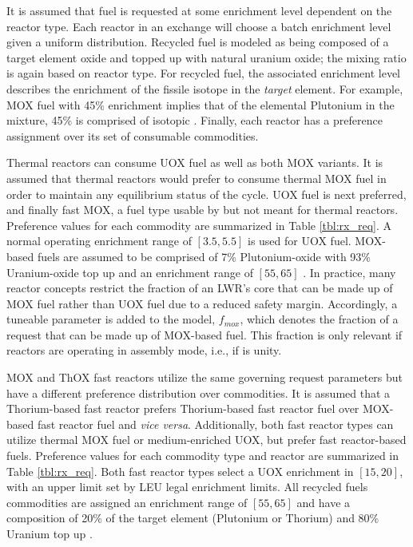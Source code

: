 It is assumed that fuel is requested at some enrichment level dependent on the
reactor type. Each reactor in an exchange will choose a batch enrichment level
given a uniform distribution. Recycled fuel is modeled as being composed of a
target element oxide and topped up with natural uranium oxide; the mixing ratio
is again based on reactor type. For recycled fuel, the associated enrichment
level describes the enrichment of the fissile isotope in the \textit{target}
element. For example, MOX fuel with 45\% enrichment implies that of the
elemental Plutonium in the mixture, 45\% is comprised of isotopic
. Finally, each reactor has a preference assignment over its set
of consumable commodities.

Thermal reactors can consume UOX fuel as well as both MOX variants. It is
assumed that thermal reactors would prefer to consume thermal MOX fuel in order
to maintain any equilibrium status of the cycle. UOX fuel is next preferred, and
finally fast MOX, a fuel type usable by but not meant for thermal
reactors. Preference values for each commodity are summarized in Table
\ref{tbl:rx_req}. A normal operating enrichment range of $[3.5, 5.5]$ is used
for UOX fuel. MOX-based fuels are assumed to be comprised of 7\% Plutonium-oxide
with 93\% Uranium-oxide top up \cite{bertel2007management} and an enrichment
range of $[55, 65]$ \cite{bairiot2003status}. In practice, many reactor concepts
restrict the fraction of an LWR's core that can be made up of MOX fuel rather
than UOX fuel due to a reduced safety margin. Accordingly, a tuneable parameter
is added to the model, $f_{mox}$, which denotes the fraction of a request that
can be made up of MOX-based fuel. This fraction is only relevant if reactors are
operating in assembly mode, i.e., if \frx is unity.

MOX and ThOX fast reactors utilize the same governing request parameters but
have a different preference distribution over commodities. It is assumed that a
Thorium-based fast reactor prefers Thorium-based fast reactor fuel over
MOX-based fast reactor fuel and \textit{vice versa}. Additionally, both fast
reactor types can utilize thermal MOX fuel or medium-enriched UOX, but prefer
fast reactor-based fuels. Preference values for each commodity type and reactor
are summarized in Table \ref{tbl:rx_req}. Both fast reactor types select a UOX
enrichment in $[15, 20]$\cite{bairiot2003status}, with an upper limit set by LEU
legal enrichment limits. All recycled fuels commodities are assigned an
enrichment range of $[55, 65]$ \cite{bairiot2003status} and have a composition
of 20\% of the target element (Plutonium or Thorium) and 80\% Uranium top up
\cite{bairiot2003status}.

